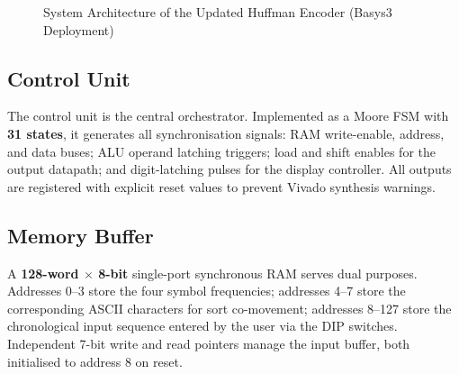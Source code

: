 \documentclass[12pt,a4paper]{article}
\begin{document}
\begin{figure}[H]
\caption{System Architecture of the Updated Huffman Encoder (Basys3 Deployment)}
\end{figure}

\subsection{Control Unit}
The control unit is the central orchestrator. Implemented as a Moore FSM with
\textbf{31 states}, it generates all synchronisation signals: RAM write-enable, address,
and data buses; ALU operand latching triggers; load and shift enables for the output
datapath; and digit-latching pulses for the display controller. All outputs are registered
with explicit reset values to prevent Vivado synthesis warnings.

\subsection{Memory Buffer}
A \textbf{128-word $\times$ 8-bit} single-port synchronous RAM serves dual purposes.
Addresses 0--3 store the four symbol frequencies; addresses 4--7 store the corresponding
ASCII characters for sort co-movement; addresses 8--127 store the chronological input
sequence entered by the user via the DIP switches. Independent 7-bit write and read
pointers manage the input buffer, both initialised to address 8 on reset.
\end{document}
